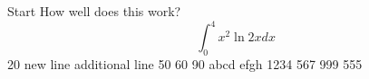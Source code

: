 \documentclass{article}
\begin{document}
Start
How well does this work?
$$\int_0^4 x^2 \ln{2x}dx$$
20
new line
additional line
50
60
90
abcd
efgh
1234
567
999
555
\end{document}
